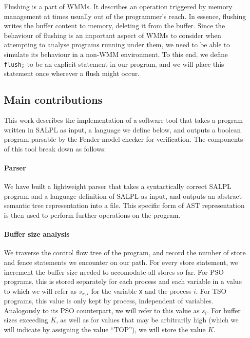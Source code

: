 Flushing is a part of WMMs. It describes an operation triggered by memory management at times usually out of the programmer's reach. In essence, flushing writes the buffer content to memory, deleting it from the buffer. Since the behaviour of flushing is an important aspect of WMMs to consider when attempting to analyse programs running under them, we need to be able to simulate its behaviour in a non-WMM environment. To this end, we define \lstinline$flush;$ to be an explicit statement in our program, and we will place this statement once wherever a flush might occur.

\subsection{Main contributions}

This work describes the implementation of a software tool that takes a program written in SALPL as input, a language we define below, and outputs a boolean program parsable by the Fender \cite{fender} model checker for verification. The components of this tool break down as follows:

\paragraph{Parser}

We have built a lightweight parser that takes a syntactically correct SALPL program and a language definition of SALPL as input, and outputs an abstract semantic tree representation into a file. This specific form of AST representation is then used to perform further operations on the program.

\paragraph{Buffer size analysis}

We traverse the control flow tree of the program, and record the number of store and fence statements we encounter on our path. For every store statement, we increment the buffer size needed to accomodate all stores so far. For PSO programs, this is stored separately for each process and each variable in a value to which we will refer as $s_{x, i}$ for the variable \lstinline$x$ and the process $i$. For TSO programs, this value is only kept by process, independent of variables. Analogously to its PSO counterpart, we will refer to this value as $s_i$. For buffer sizes exceeding $K$, as well as for values that may be arbitrarily high (which we will indicate by assigning the value ``TOP''), we will store the value $K$.

